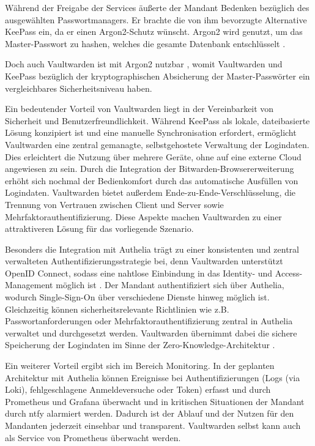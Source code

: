 Während der Freigabe der Services äußerte der Mandant Bedenken bezüglich des ausgewählten Passwortmanagers. Er brachte die von ihm bevorzugte Alternative KeePass ein, da er einen Argon2-Schutz wünscht. Argon2 wird genutzt, um das Master-Passwort zu hashen, welches die gesamte Datenbank entschlüsselt \cite{argon2}.

Doch auch Vaultwarden ist mit Argon2 nutzbar \cite{cloudron}, womit Vaultwarden und KeePass bezüglich der kryptographischen Absicherung der Master-Passwörter ein vergleichbares Sicherheitsniveau haben. 

Ein bedeutender Vorteil von Vaultwarden liegt in der Vereinbarkeit von Sicherheit und Benutzerfreundlichkeit. Während KeePass als lokale, dateibasierte Lösung konzipiert ist und eine manuelle Synchronisation erfordert, ermöglicht Vaultwarden eine zentral gemanagte, selbstgehostete Verwaltung der Logindaten. Dies erleichtert die Nutzung über mehrere Geräte, ohne auf eine externe Cloud angewiesen zu sein. Durch die Integration der Bitwarden-Browsererweiterung erhöht sich nochmal der Bedienkomfort durch das automatische Ausfüllen von Logindaten. Vaultwarden bietet außerdem Ende-zu-Ende-Verschlüsselung, die Trennung von Vertrauen zwischen Client und Server sowie Mehrfaktorauthentifizierung. Diese Aspekte machen Vaultwarden zu einer attraktiveren Lösung für das vorliegende Szenario. \cite{vaultwarden_git} 

Besonders die Integration mit Authelia trägt zu einer konsistenten und zentral verwalteten Authentifizierungsstrategie bei, denn Vaultwarden unterstützt OpenID Connect, sodass eine nahtlose Einbindung in das Identity- und Access-Management möglich ist \cite{v1350}. Der Mandant authentifiziert sich über Authelia, wodurch Single-Sign-On über verschiedene Dienste hinweg möglich ist. Gleichzeitig können sicherheitsrelevante Richtlinien wie z.B. Passwortanforderungen oder Mehrfaktorauthentifizierung zentral in Authelia verwaltet und durchgesetzt werden. Vaultwarden übernimmt dabei die sichere Speicherung der Logindaten im Sinne der Zero-Knowledge-Architektur \cite{hussain_2026}. 

Ein weiterer Vorteil ergibt sich im Bereich Monitoring. In der geplanten Architektur mit Authelia können Ereignisse bei Authentifizierungen (Logs (via Loki), fehlgeschlagene Anmeldeversuche oder Token) erfasst und durch Prometheus und Grafana überwacht und in kritischen Situationen der Mandant durch ntfy alarmiert werden. Dadurch ist der Ablauf und der Nutzen für den Mandanten jederzeit einsehbar und transparent. Vaultwarden selbst kann auch als Service von Prometheus überwacht werden.


